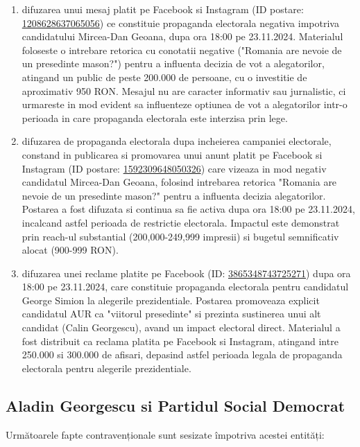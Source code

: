 \documentclass[a4paper,12pt]{article}
\begin{document}
\begin{enumerate}[leftmargin=*, label=\arabic*.)]
    \item difuzarea unui mesaj platit pe Facebook si Instagram (ID postare: \href{https://www.facebook.com/ads/library/?id=1208628637065056}{1208628637065056}) ce constituie propaganda electorala negativa impotriva candidatului Mircea-Dan Geoana, dupa ora 18:00 pe 23.11.2024. Materialul foloseste o intrebare retorica cu conotatii negative ("Romania are nevoie de un presedinte mason?") pentru a influenta decizia de vot a alegatorilor, atingand un public de peste 200.000 de persoane, cu o investitie de aproximativ 950 RON. Mesajul nu are caracter informativ sau jurnalistic, ci urmareste in mod evident sa influenteze optiunea de vot a alegatorilor intr-o perioada in care propaganda electorala este interzisa prin lege.
    \item difuzarea de propaganda electorala dupa incheierea campaniei electorale, constand in publicarea si promovarea unui anunt platit pe Facebook si Instagram (ID postare: \href{https://www.facebook.com/ads/library/?id=1592309648050326}{1592309648050326}) care vizeaza in mod negativ candidatul Mircea-Dan Geoana, folosind intrebarea retorica "Romania are nevoie de un presedinte mason?" pentru a influenta decizia alegatorilor. Postarea a fost difuzata si continua sa fie activa dupa ora 18:00 pe 23.11.2024, incalcand astfel perioada de restrictie electorala. Impactul este demonstrat prin reach-ul substantial (200,000-249,999 impresii) si bugetul semnificativ alocat (900-999 RON).
    \item difuzarea unei reclame platite pe Facebook (ID: \href{https://www.facebook.com/ads/library/?id=3865348743725271}{3865348743725271}) dupa ora 18:00 pe 23.11.2024, care constituie propaganda electorala pentru candidatul George Simion la alegerile prezidentiale. Postarea promoveaza explicit candidatul AUR ca "viitorul presedinte" si prezinta sustinerea unui alt candidat (Calin Georgescu), avand un impact electoral direct. Materialul a fost distribuit ca reclama platita pe Facebook si Instagram, atingand intre 250.000 si 300.000 de afisari, depasind astfel perioada legala de propaganda electorala pentru alegerile prezidentiale.
\end{enumerate}

\vspace{0.5cm}

\subsection{Aladin Georgescu si Partidul Social Democrat}
Următoarele fapte contravenționale sunt sesizate împotriva acestei entități:
\end{document}
